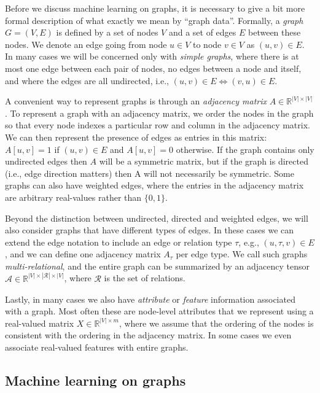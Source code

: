 \documentclass[10pt]{book}
\let\defaultmarginpar\marginpar
\renewcommand\marginpar[2][]{\defaultmarginpar{\itshape\color{gray}#2}}
\begin{document}
Before we discuss machine learning on graphs, it is necessary to give a bit more formal description of what exactly we mean by ``graph data''. Formally, a \emph{graph}\marginpar{graph} $G = (V, E)$ is defined by a set of nodes $V$ and a set of edges $E$ between these nodes. We denote an edge going from node $u \in V$ to node $v \in V$ as $(u, v) \in E$. In many cases we will be concerned only with \emph{simple graphs}, where there is at most one edge between each pair of nodes, no edges between a node and itself, and where the edges are all undirected, i.e., $(u, v) \in E \Longleftrightarrow  (v, u) \in E$.

A convenient way to represent graphs is through an \emph{adjacency matrix}\marginpar{adjacency matrix} $A \in
\mathbb R^{|V| \times |V|}$. To represent a graph with an adjacency matrix, we order the nodes in the graph so that every node indexes a particular row and column in the adjacency matrix. We can then represent the presence of edges as entries in this matrix: $A[u, v] = 1$ if $(u, v) \in E$ and $A[u, v] = 0$ otherwise. If the graph contains only undirected edges then $A$ will be a symmetric matrix, but if the graph is directed (i.e., edge direction matters) then A will not necessarily be symmetric. Some graphs can also have weighted edges, where the entries in the adjacency matrix are arbitrary real-values rather than $\{0, 1\}$.

Beyond the distinction between undirected, directed and weighted edges, we will also consider graphs that have different types of edges. In these cases we can extend the edge notation to include an edge or relation type $\tau$, e.g., $(u, \tau, v) \in E$, and we can define one adjacency matrix $A_\tau$ per edge type. We call such graphs \emph{multi-relational}\marginpar{multi-relational graph}, and the entire graph can be summarized by an adjacency tensor $\mathcal A \in \mathbb R^{|V| \times |\mathcal R| \times |V|}$, where $\mathcal R$ is the set of relations.

Lastly, in many cases we also have \emph{attribute} or \emph{feature} information associated with a graph. Most often these are node-level attributes that we represent using a real-valued matrix $X \in \mathbb R^{|V| \times m}$, where we assume that the ordering of the nodes is consistent with the ordering in the adjacency matrix. In some cases we even associate real-valued features with entire graphs.

\subsection{Machine learning on graphs}
\end{document}
